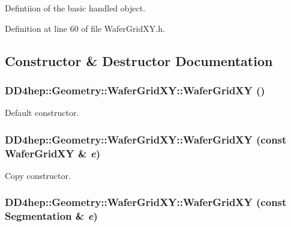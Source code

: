 Defintiion of the basic handled object. 

Definition at line 60 of file WaferGridXY.h.

\subsection{Constructor \& Destructor Documentation}
\hypertarget{class_d_d4hep_1_1_geometry_1_1_wafer_grid_x_y_a01215216f63ad87ba40a86e5c4320896}{
\subsubsection[{WaferGridXY}]{\setlength{\rightskip}{0pt plus 5cm}DD4hep::Geometry::WaferGridXY::WaferGridXY ()}}
\label{class_d_d4hep_1_1_geometry_1_1_wafer_grid_x_y_a01215216f63ad87ba40a86e5c4320896}


Default constructor. \hypertarget{class_d_d4hep_1_1_geometry_1_1_wafer_grid_x_y_a7f66d48035db3df949399962957ed7f3}{
\subsubsection[{WaferGridXY}]{\setlength{\rightskip}{0pt plus 5cm}DD4hep::Geometry::WaferGridXY::WaferGridXY (const {\bf WaferGridXY} \& {\em e})}}
\label{class_d_d4hep_1_1_geometry_1_1_wafer_grid_x_y_a7f66d48035db3df949399962957ed7f3}


Copy constructor. \hypertarget{class_d_d4hep_1_1_geometry_1_1_wafer_grid_x_y_aa6d983e937d1912b96e3a2f120458afa}{
\subsubsection[{WaferGridXY}]{\setlength{\rightskip}{0pt plus 5cm}DD4hep::Geometry::WaferGridXY::WaferGridXY (const {\bf Segmentation} \& {\em e})}}
\label{class_d_d4hep_1_1_geometry_1_1_wafer_grid_x_y_aa6d983e937d1912b96e3a2f120458afa}


